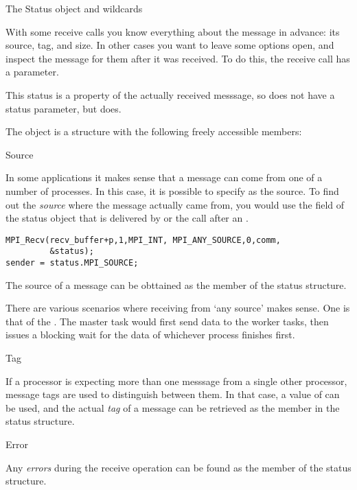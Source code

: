  {The Status object and wildcards}
\label{sec:mpi-wildcard}
\label{sec:mpi-status}

With some receive calls you know everything about the message in advance:
its source, tag, and size. In other cases you want to leave some options
open, and inspect the message for them after it was received.
To do this, the receive call has a 
parameter.

This status is a property of the actually received messsage, so 
does not have a status parameter, but  does.

The  object
is a structure with the following
freely accessible members:

 {Source}

In some applications it makes sense that a message can come from 
one of a number of processes. In this case, it is possible to specify
 as the source.
%
To find out the \emph{source}
where the message actually
came from, you would use the  field of the status object
that is delivered by  or the  call after an .
\begin{lstlisting}
MPI_Recv(recv_buffer+p,1,MPI_INT, MPI_ANY_SOURCE,0,comm,
         &status);
sender = status.MPI_SOURCE;
\end{lstlisting}

The source of a message can be obttained as the
member of the status structure.


There are various scenarios where receiving from `any source' makes sense.
One is that of the . The master task would first send
data to the worker tasks, then issues a blocking wait for the data of whichever process
finishes first.

 {Tag}

If a processor is expecting more than one messsage from a single other processor,
message tags are used to distinguish between them. In that case,
a value of  can be used, and the actual
\emph{tag}
of a message can be retrieved as the
%
%
member in the status structure.


 {Error}

Any \emph{errors}
during the receive operation can be found as the
member of the status structure.


